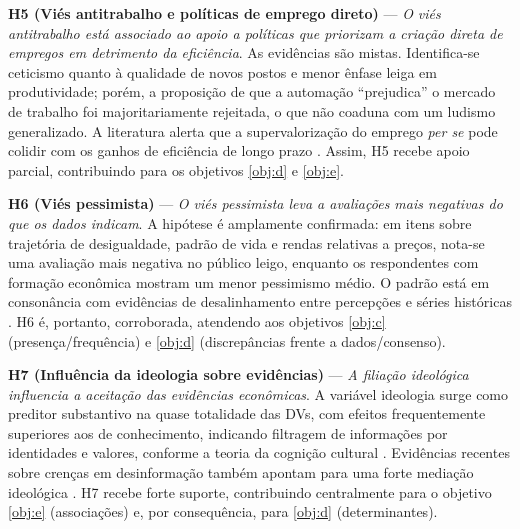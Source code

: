 \textbf{H5 (Viés antitrabalho e políticas de emprego direto)} — \textit{O viés antitrabalho está associado ao apoio a políticas que priorizam a criação direta de empregos em detrimento da eficiência}. As evidências são mistas. Identifica-se ceticismo quanto à qualidade de novos postos e menor ênfase leiga em produtividade; porém, a proposição de que a automação “prejudica” o mercado de trabalho foi majoritariamente rejeitada, o que não coaduna com um ludismo generalizado. A literatura alerta que a supervalorização do emprego \emph{per se} pode colidir com os ganhos de eficiência de longo prazo \cite{landsburg2012armchair,sowell2007conflict}. Assim, H5 recebe apoio parcial, contribuindo para os objetivos \autoref{obj:d} e \autoref{obj:e}.

\textbf{H6 (Viés pessimista)} — \textit{O viés pessimista leva a avaliações mais negativas do que os dados indicam}. A hipótese é amplamente confirmada: em itens sobre trajetória de desigualdade, padrão de vida e rendas relativas a preços, nota-se uma avaliação mais negativa no público leigo, enquanto os respondentes com formação econômica mostram um menor pessimismo médio. O padrão está em consonância com evidências de desalinhamento entre percepções e séries históricas \cite{easterbrook2004progress, ridleyotimista}. H6 é, portanto, corroborada, atendendo aos objetivos \autoref{obj:c} (presença/frequência) e \autoref{obj:d} (discrepâncias frente a dados/consenso).

\textbf{H7 (Influência da ideologia sobre evidências)} — \textit{A filiação ideológica influencia a aceitação das evidências econômicas}. A variável ideologia surge como preditor substantivo na quase totalidade das DVs, com efeitos frequentemente superiores aos de conhecimento, indicando filtragem de informações por identidades e valores, conforme a teoria da cognição cultural \cite{kahan2012polarization}. Evidências recentes sobre crenças em desinformação também apontam para uma forte mediação ideológica \cite{rossini2023explaining}. H7 recebe forte suporte, contribuindo centralmente para o objetivo \autoref{obj:e} (associações) e, por consequência, para \autoref{obj:d} (determinantes).

